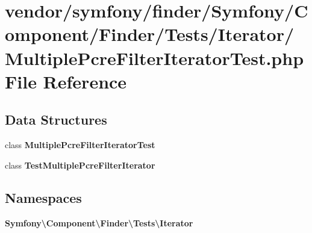 \section{vendor/symfony/finder/\+Symfony/\+Component/\+Finder/\+Tests/\+Iterator/\+Multiple\+Pcre\+Filter\+Iterator\+Test.php File Reference}
\label{_multiple_pcre_filter_iterator_test_8php}
\subsection*{Data Structures}
\begin{DoxyCompactItemize}
\item 
class {\bf Multiple\+Pcre\+Filter\+Iterator\+Test}
\item 
class {\bf Test\+Multiple\+Pcre\+Filter\+Iterator}
\end{DoxyCompactItemize}
\subsection*{Namespaces}
\begin{DoxyCompactItemize}
\item 
 {\bf Symfony\textbackslash{}\+Component\textbackslash{}\+Finder\textbackslash{}\+Tests\textbackslash{}\+Iterator}
\end{DoxyCompactItemize}
